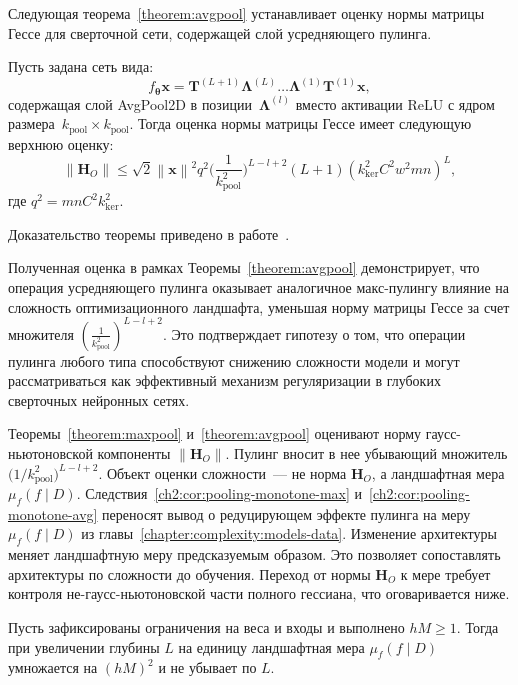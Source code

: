 Следующая теорема~\ref{theorem:avgpool} устанавливает оценку нормы матрицы Гессе для сверточной сети, содержащей слой усредняющего пулинга.

\begin{theorem}\label{theorem:avgpool}
    Пусть задана сеть вида:
    \[
        f_{\boldsymbol{\theta}}{\mathbf{x}} = \mathbf{T}^{(L+1)}\boldsymbol{\Lambda}^{(L)}\dots \boldsymbol{\Lambda}^{(1)}\mathbf{T}^{(1)}\mathbf{x},
    \]
    содержащая слой AvgPool2D в позиции~$\boldsymbol{\Lambda}^{(l)}$ вместо активации ReLU с ядром размера~$k_{\mathrm{pool}} \times k_{\mathrm{pool}}$.
    Тогда оценка нормы матрицы Гессе имеет следующую верхнюю оценку:
    \[
        \left\|\mathbf{H}_O\right\| \leqslant \sqrt{2}\left\|\mathbf{x}\right\|^2q^2\big(\frac{1}{k_{\mathrm{pool}}^2}\big)^{L-l+2}(L+1)(k_{\mathrm{ker}}^2C^2w^2mn)^{L},
    \]
где $q^2 = mnC^2k_{\mathrm{ker}}^2$.
\end{theorem}
Доказательство теоремы приведено в работе~\cite{grabovoi2024convnets743111032}.

\begin{remark}
    Полученная оценка в рамках Теоремы~\ref{theorem:avgpool} демонстрирует, что операция усредняющего пулинга оказывает аналогичное макс-пулингу влияние на сложность оптимизационного ландшафта, уменьшая норму матрицы Гессе за счет множителя $\left(\frac{1}{k_{\mathrm{pool}}^2}\right)^{L-l+2}$.
    Это подтверждает гипотезу о том, что операции пулинга любого типа способствуют снижению сложности модели и могут рассматриваться как эффективный механизм регуляризации в глубоких сверточных нейронных сетях.
\end{remark}

Теоремы~\ref{theorem:maxpool} и~\ref{theorem:avgpool} оценивают норму гаусс-ньютоновской компоненты $\|\mathbf{H}_O\|$.
Пулинг вносит в нее убывающий множитель $\bigl(1/k_{\mathrm{pool}}^2\bigr)^{L-l+2}$.
Объект оценки сложности~--- не норма $\mathbf{H}_O$, а ландшафтная мера $\mu_f(f\mid D)$.
Следствия~\ref{ch2:cor:pooling-monotone-max} и~\ref{ch2:cor:pooling-monotone-avg} переносят вывод о редуцирующем эффекте пулинга на меру $\mu_f(f\mid D)$ из главы~\ref{chapter:complexity:models-data}.
Изменение архитектуры меняет ландшафтную меру предсказуемым образом.
Это позволяет сопоставлять архитектуры по сложности до обучения.
Переход от нормы $\mathbf{H}_O$ к мере требует контроля не-гаусс-ньютоновской части полного гессиана, что оговаривается ниже.

\begin{corollary}\label{ch2:cor:pooling-monotone}
Пусть зафиксированы ограничения на веса и входы и выполнено $hM\ge 1$. Тогда при увеличении глубины $L$ на единицу ландшафтная мера $\mu_f(f\mid D)$ умножается на $(hM)^2$ и не убывает по $L$.
\end{corollary}

